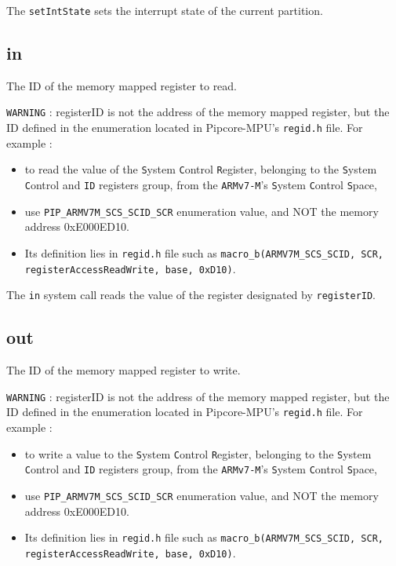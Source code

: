 \documentclass[10pt,a4paper,titlepage]{refart}
\begin{document}
The \texttt{setIntState} sets the interrupt state of the current partition.

\subsection{in}
The ID of the memory mapped register to read.

\texttt{WARNING} : registerID is not the address of the memory mapped register, but the ID defined in
the enumeration located in Pipcore-MPU's \texttt{regid.h} file.
For example :
\begin{itemize}
    \item to read the value of the \texttt{S}ystem \texttt{C}ontrol \texttt{R}egister, belonging to the \texttt{S}ystem \texttt{C}ontrol and \texttt{ID} registers group, from the \texttt{ARMv7-M}'s \texttt{S}ystem \texttt{C}ontrol \texttt{S}pace,
    \item use \texttt{PIP\_ARMV7M\_SCS\_SCID\_SCR} enumeration value, and NOT the memory address 0xE000ED10.
    \item Its definition lies in \texttt{regid.h} file such as \texttt{macro\_b(ARMV7M\_SCS\_SCID, SCR, registerAccessReadWrite, base, 0xD10)}.
\end{itemize}

\medskip
The \texttt{in} system call reads the value of the register designated by \texttt{registerID}.

\subsection{out}
The ID of the memory mapped register to write.

\texttt{WARNING} : registerID is not the address of the memory mapped register, but the ID defined in
the enumeration located in Pipcore-MPU's \texttt{regid.h} file.
For example :
\begin{itemize}
    \item to write a value to the \texttt{S}ystem \texttt{C}ontrol \texttt{R}egister, belonging to the \texttt{S}ystem \texttt{C}ontrol and \texttt{ID} registers group, from the \texttt{ARMv7-M}'s \texttt{S}ystem \texttt{C}ontrol \texttt{S}pace,
    \item use \texttt{PIP\_ARMV7M\_SCS\_SCID\_SCR} enumeration value, and NOT the memory address 0xE000ED10.
    \item Its definition lies in \texttt{regid.h} file such as \texttt{macro\_b(ARMV7M\_SCS\_SCID, SCR, registerAccessReadWrite, base, 0xD10)}.
\end{itemize}
\end{document}
